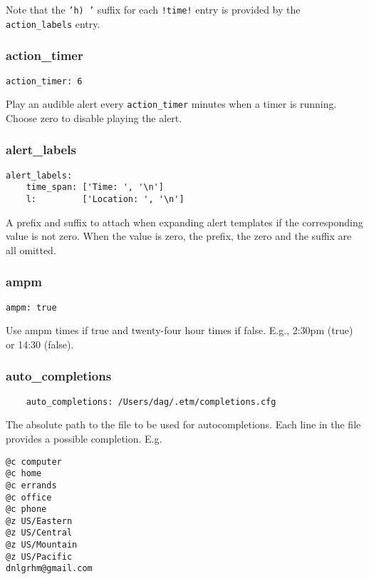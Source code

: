 \documentclass[]{article}
\begin{document}
Note that the \texttt{'h) '} suffix for each \texttt{!time!} entry is
provided by the \texttt{action\_labels} entry.

\subsubsection{action\_timer}

\begin{verbatim}
action_timer: 6
\end{verbatim}

Play an audible alert every \texttt{action\_timer} minutes when a timer
is running. Choose zero to disable playing the alert.

\subsubsection{alert\_labels}

\begin{verbatim}
alert_labels:
    time_span: ['Time: ', '\n']
    l:         ['Location: ', '\n']
\end{verbatim}

A prefix and suffix to attach when expanding alert templates if the
corresponding value is not zero. When the value is zero, the prefix, the
zero and the suffix are all omitted.

\subsubsection{ampm}

\begin{verbatim}
ampm: true
\end{verbatim}

Use ampm times if true and twenty-four hour times if false. E.g., 2:30pm
(true) or 14:30 (false).

\subsubsection{auto\_completions}

\begin{verbatim}
    auto_completions: /Users/dag/.etm/completions.cfg
\end{verbatim}

The absolute path to the file to be used for autocompletions. Each line
in the file provides a possible completion. E.g.

\begin{verbatim}
@c computer
@c home
@c errands
@c office
@c phone
@z US/Eastern
@z US/Central
@z US/Mountain
@z US/Pacific
dnlgrhm@gmail.com
\end{verbatim}
\end{document}
